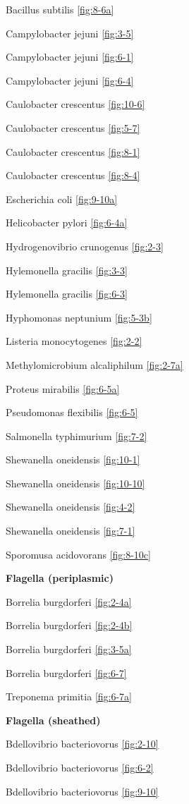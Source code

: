 \documentclass[]{tufte-book}
\begin{document}
Bacillus subtilis \ref{fig:8-6a}

Campylobacter jejuni \ref{fig:3-5}

Campylobacter jejuni \ref{fig:6-1}

Campylobacter jejuni \ref{fig:6-4}

Caulobacter crescentus \ref{fig:10-6}

Caulobacter crescentus \ref{fig:5-7}

Caulobacter crescentus \ref{fig:8-1}

Caulobacter crescentus \ref{fig:8-4}

Escherichia coli \ref{fig:9-10a}

Helicobacter pylori \ref{fig:6-4a}

Hydrogenovibrio crunogenus \ref{fig:2-3}

Hylemonella gracilis \ref{fig:3-3}

Hylemonella gracilis \ref{fig:6-3}

Hyphomonas neptunium \ref{fig:5-3b}

Listeria monocytogenes \ref{fig:2-2}

Methylomicrobium alcaliphilum \ref{fig:2-7a}

Proteus mirabilis \ref{fig:6-5a}

Pseudomonas flexibilis \ref{fig:6-5}

Salmonella typhimurium \ref{fig:7-2}

Shewanella oneidensis \ref{fig:10-1}

Shewanella oneidensis \ref{fig:10-10}

Shewanella oneidensis \ref{fig:4-2}

Shewanella oneidensis \ref{fig:7-1}

Sporomusa acidovorans \ref{fig:8-10c}

\textbf{Flagella (periplasmic)}

Borrelia burgdorferi \ref{fig:2-4a}

Borrelia burgdorferi \ref{fig:2-4b}

Borrelia burgdorferi \ref{fig:3-5a}

Borrelia burgdorferi \ref{fig:6-7}

Treponema primitia \ref{fig:6-7a}

\textbf{Flagella (sheathed)}

Bdellovibrio bacteriovorus \ref{fig:2-10}

Bdellovibrio bacteriovorus \ref{fig:6-2}

Bdellovibrio bacteriovorus \ref{fig:9-10}
\end{document}
